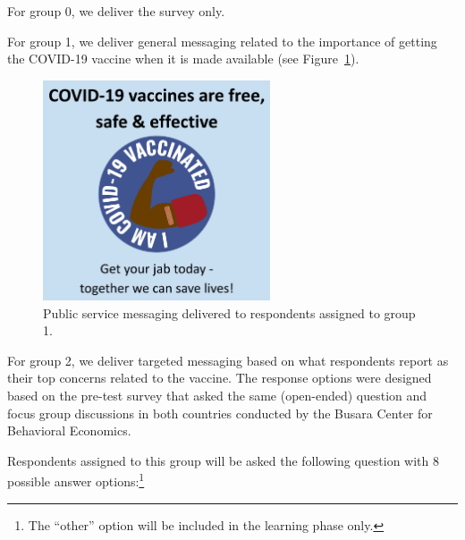 \documentclass[letterpaper, 12pt, parskip=full,DIV=10]{scrartcl}
\begin{document}
For group 0, we deliver the survey only.

For group 1, we deliver general messaging related to the importance of getting the COVID-19 vaccine when it is made available (see Figure~\ref{fig:psa}).

\begin{figure}[h!]
   \centering
   \includegraphics[width = 0.6\textwidth]{../../tables-figures/psa.png} 
   \caption{Public service messaging delivered to respondents assigned to group 1.}
   \label{fig:psa}
\end{figure}

For group 2, we deliver targeted messaging based on what respondents report as their top concerns related to the vaccine. The response options were designed based on the pre-test survey that asked the same (open-ended) question and focus group discussions in both countries conducted by the Busara Center for Behavioral Economics. 

Respondents assigned to this group will be asked the following question with 8 possible answer options:\footnote{The ``other'' option will be included in the learning phase only. }
\end{document}
